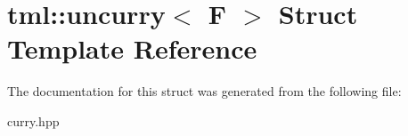 \hypertarget{structtml_1_1uncurry}{\section{tml\+:\+:uncurry$<$ F $>$ Struct Template Reference}
\label{structtml_1_1uncurry}
}


The documentation for this struct was generated from the following file\+:\begin{DoxyCompactItemize}
\item 
curry.\+hpp\end{DoxyCompactItemize}
